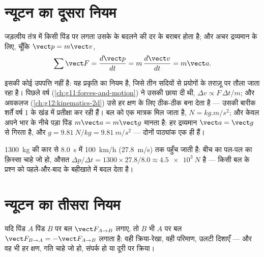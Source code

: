 \section{न्यूटन का दूसरा नियम}

\begin{theorem}[न्यूटन का दूसरा नियम]\label{thm:g12:newtons-laws:second}
जड़त्वीय तंत्र में किसी पिंड पर लगता  उसके  के
बदलने की दर के बराबर होता है; और अचर द्रव्यमान के लिए, चूँकि $\vect p = m\vect v$,
\[
\sum \vect F = \frac{d\vect p}{dt} = m\,\frac{d\vect v}{dt} = m \vect a .
\]
\end{theorem}
\admitted

\begin{remark}[प्रकृति का एक नियम, और उसका मात्रक]\label{rem:g12:newtons-laws:nature}
इसकी कोई उपपत्ति नहीं है: यह प्रकृति का नियम है, जिसे तीन सदियों से प्रयोगों
के तराज़ू पर तौला जाता रहा है। पिछले वर्ष (\cref{ch:g11:forces-and-motion}) ने उसकी छाया दी थी, $\Delta v \propto F\,\Delta t/m$;
और अवकलज (\cref{ch:g12:kinematics-2d}) उसे हर क्षण के लिए ठीक-ठीक बना देता है --- उसकी बारीक शर्तें
वर्ष 1 के खंड में प्रतीक्षा कर रही हैं। बल को एक मात्रक मिल
जाता है, $\unit{N} = \unit{kg.m/s^2}$; और केवल अपने भार के नीचे पड़ा पिंड $m\vect a = m\vect g$ मानता है:
हर द्रव्यमान $\vect a = \vect g$ से गिरता है, और $g = \qty{9.81}{N/kg} = \qty{9.81}{m/s^2}$ --- दोनों पाठ्यांक एक ही हैं।
\end{remark}

\begin{example}[औसत बल, ब्योरे की ज़रूरत नहीं]\label{ex:g12:newtons-laws:average}
\qty{1300}{kg} की कार  से \qty{8.0}{s} में \qty{100}{km/h} (\qty{27.8}{m/s}) तक पहुँच जाती है: बीच का
पल-पल का क़िस्सा चाहे जो हो, औसत  $\Delta p/\Delta t = 1300 \times 27.8/8.0 \approx \qty{4.5e3}{N}$ है --- 
किसी बल के प्रश्न को पहले-और-बाद के बहीखाते में बदल देता है।
\end{example}

\section{न्यूटन का तीसरा नियम}

\begin{theorem}[न्यूटन का तीसरा नियम]\label{thm:g12:newtons-laws:third}
यदि पिंड $A$ पिंड $B$ पर बल $\vect F_{A \to B}$ लगाए, तो $B$ भी $A$ पर
बल $\vect F_{B \to A} = -\vect F_{A \to B}$ लगाता है: वही क्रिया-रेखा, वही परिमाण, उलटी दिशाएँ --- और वह
भी हर क्षण, गति चाहे जो हो, संपर्क हो या दूरी पर क्रिया।
\end{theorem}
\admitted

